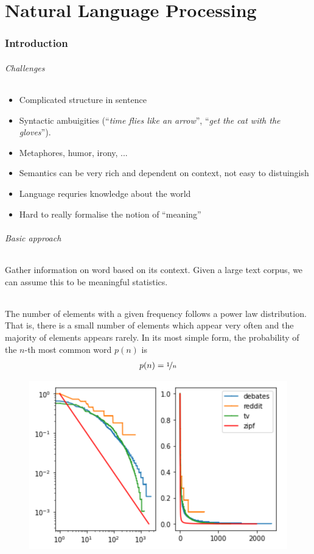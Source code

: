 \documentclass[10pt,twocolumn]{article}
\begin{document}
\part{Natural Language Processing}

\section{Introduction}

\paragraph{\textit{Challenges}}
\begin{itemize}
\item Complicated structure in sentence
\item Syntactic ambuigities (``\textit{time flies like an arrow}'',
  ``\textit{get the cat with the gloves}'').
\item Metaphores, humor, irony, ...
\item Semantics can be very rich and dependent on context, not easy to
  distuingish
\item Language requries knowledge about the world
\item Hard to really formalise the notion of ``meaning''
\end{itemize}

\paragraph{\textit{Basic approach}} Gather information on word based on its
context. Given a large text corpus, we can assume this to be meaningful
statistics.

\paragraph{} The number of elements with a given frequency
follows a power law distribution. That is, there is a small number of elements
which appear very often and the majority of elements appears rarely. In its most
simple form, the probability of the $n$-th most common word $p(n)$ is
\begin{align*}
  p(n) = \nicefrac{1}{n}
\end{align*}
\begin{figure}[h]
  \centering
  \includegraphics[width=0.8\linewidth]{zipf.png}
\end{figure}
\end{document}
